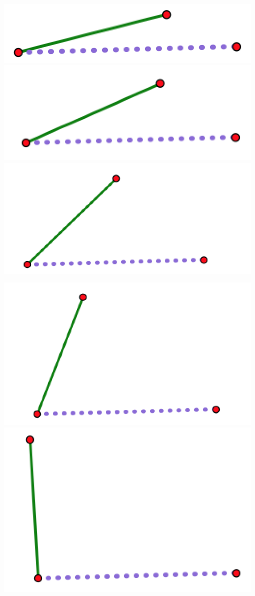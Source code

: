 \begin{center}
\includegraphics[scale = .4]{open1}
 \includegraphics[scale = .4]{open2}
 \includegraphics[scale = .4]{open3}

\includegraphics[scale = .4]{open4}
\quad
\includegraphics[scale = .4]{open5}


\end{center}
